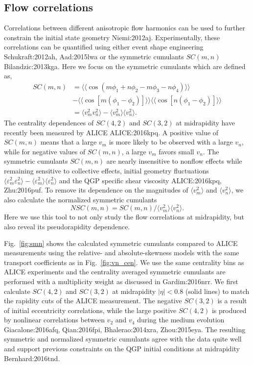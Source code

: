 \subsection{Flow correlations}

Correlations between different anisotropic flow harmonics can be used to further constrain the initial state geometry {Niemi:2012aj}.
Experimentally, these correlations can be quantified using either event shape engineering {Schukraft:2012ah, Aad:2015lwa} or the symmetric cumulants $SC(m,n)$ {Bilandzic:2013kga}. 
Here we focus on the symmetric cumulants which are defined as,
\begin{align}
SC(m, n) &= \langle\langle \cos(m\phi_1+n\phi_2-m\phi_3-n\phi_4)\rangle\rangle \nonumber \\
\nonumber &- \langle\langle\cos[m(\phi_1-\phi_2)]\rangle\rangle\langle\langle\cos[n(\phi_1-\phi_2)]\rangle\rangle \label{eq:scmn}\\
&= \langle v_m^2 v_n^2 \rangle - \langle v_m^2\rangle\langle v_n^2\rangle.
\end{align}
The centrality dependences of $SC(4,2)$ and $ SC(3,2)$ at midrapidity have recently been measured by ALICE {ALICE:2016kpq}. 
A positive value of $SC(m,n)$ means that a large $v_m$ is more likely to be observed with a large $v_n$, while for negative values of $SC(m,n)$, a large $v_m$ favors small $v_n$.
The symmetric cumulants $SC(m,n)$ are nearly insensitive to nonflow effects while remaining sensitive to collective effects, initial geometry fluctuations $\langle \varepsilon_m^2 \varepsilon_n^2 \rangle - \langle \varepsilon_m^2 \rangle \langle \varepsilon_n^2 \rangle$ and the QGP specific shear viscosity {ALICE:2016kpq, Zhu:2016puf}.
To remove its dependence on the magnitudes of $\langle v_m^2\rangle$ and $\langle v_n^2\rangle$, we also calculate the normalized symmetric cumulants
\begin{equation}
  NSC(m,n) = SC(m,n)/\langle v_m^2\rangle\langle v_n^2\rangle.
\end{equation}
Here we use this tool to not only study the flow correlations at midrapidity, but also reveal its pseudorapidity dependence.

Fig.~\ref{fig:smn} shows the calculated symmetric cumulants compared to ALICE measurements using the relative- and absolute-skewness models with the same transport coefficients as in Fig.~\ref{fig:vn_cen}. 
We use the same centrality bins as ALICE experiments and the centrality averaged symmetric cumulants are performed with a multiplicity weight as discussed in {Gardim:2016nrr}.
We first calculate $SC(4,2)$ and $SC(3,2)$ at midrapidity $|\eta|<0.8$ (solid lines) to match the rapidity cuts of the ALICE measurement.
The negative $SC(3,2)$ is a result of initial eccentricity correlations, while the large positive $SC(4,2)$ is produced by nonlinear correlations between $v_2$ and $v_4$ during the medium evolution {Giacalone:2016afq, Qian:2016fpi, Bhalerao:2014xra, Zhou:2015eya}.
The resulting symmetric and normalized symmetric cumulants agree with the data quite well and support previous constraints on the QGP initial conditions at midrapidity {Bernhard:2016tnd}. 

